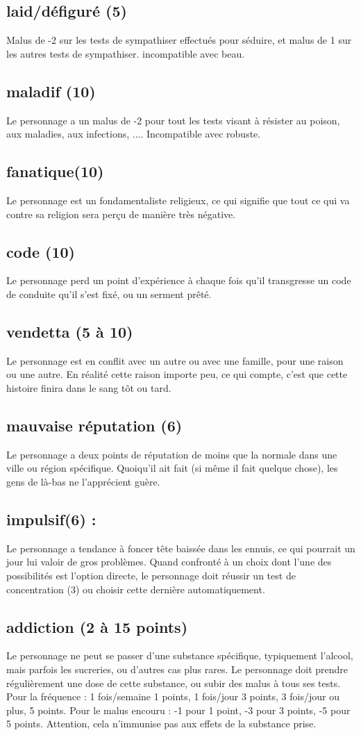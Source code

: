\documentclass[10pt,a4paper,twocolumn]{book}
\begin{document}
\subsection*{laid/défiguré (5) } 
Malus de -2 sur les tests de sympathiser effectués pour séduire, et malus de 1 sur les autres tests de sympathiser. incompatible avec beau.
\subsection*{maladif (10) }
Le personnage a un malus de -2 pour tout les tests visant à résister au poison, aux maladies, aux infections, .... Incompatible avec robuste.
\subsection*{fanatique(10) }
Le personnage est un fondamentaliste religieux, ce qui signifie que tout ce qui va contre sa religion sera perçu de manière très négative.
\subsection*{code (10) } 
Le personnage perd un point d'expérience à chaque fois qu'il transgresse un code de conduite qu'il s'est fixé, ou un serment prêté.
\subsection*{vendetta (5 à 10) }
Le personnage est en conflit avec un autre ou avec une famille, pour une raison ou une autre. En réalité cette raison importe peu, ce qui compte, c'est que cette histoire finira dans le sang tôt ou tard.
\subsection*{mauvaise réputation (6) } 
Le personnage a deux points de réputation de moins que la normale dans une ville ou région spécifique. Quoiqu'il ait fait (si même il fait quelque chose), les gens de là-bas ne l'apprécient guère.
\subsection*{impulsif(6) :}
Le personnage a tendance à foncer tête baissée dans les ennuis, ce qui pourrait un jour lui valoir de gros problèmes. Quand confronté à un choix dont l'une des possibilités est l'option directe, le personnage doit réussir un test de concentration (3) ou choisir cette dernière automatiquement.
\subsection*{addiction (2 à 15 points) }
Le personnage ne peut se passer d'une substance spécifique, typiquement l'alcool, mais parfois les sucreries, ou d'autres cas plus rares. Le personnage doit prendre régulièrement une dose de cette substance, ou subir des malus à tous ses tests. Pour la fréquence : 1 fois/semaine 1 points, 1 fois/jour 3 points, 3 fois/jour ou plus, 5 points. Pour le malus encouru : -1 pour 1 point, -3 pour 3 points, -5 pour 5 points. Attention, cela n'immunise pas aux effets de la substance prise.
\end{document}
